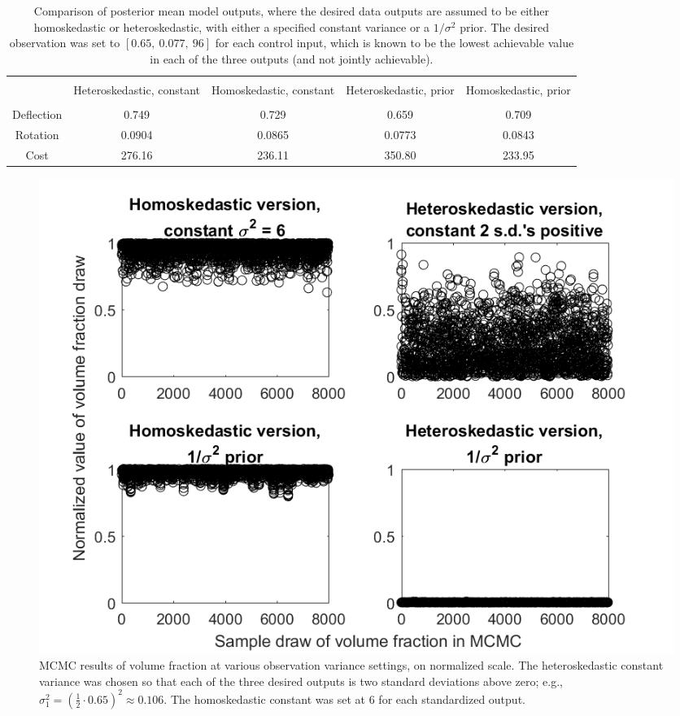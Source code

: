 \documentclass{article}
\begin{document}
\begin{table}[h]
\centering
\begin{tabular}{| c | c  |  c  | c |  c  |}
\hline
 \vspace{-3mm}
& & & & \\
& \parbox{24mm}{\centering Heteroskedastic, constant}& \parbox{24mm}{\centering Homoskedastic, constant}& \parbox{24mm}{\centering Heteroskedastic, prior} & \parbox{24mm}{\centering Homoskedastic, prior}\\
 \vspace{-3.5mm}
& & & & \\
\hline
Deflection & 0.749 & 0.729 & 0.659 & 0.709\\
Rotation & 0.0904 & 0.0865 & 0.0773 & 0.0843\\
Cost & 276.16 & 236.11 & 350.80 & 233.95 \\
\hline
\end{tabular}
\captionsetup{width=.8\linewidth}
\caption{Comparison of posterior mean model outputs, where the desired data outputs are assumed to be either homoskedastic or heteroskedastic, with either a specified constant variance or a $1/\sigma^2$ prior. The desired observation was set to $[0.65,\ 0.077,\ 96]$ for each control input, which is known to be the lowest achievable value in each of the three outputs (and not jointly achievable). }
\label{table:obs_vvar_comp}
\end{table}

\begin{figure}[h]
\centering
\includegraphics[width=.75\linewidth]{FIG_comp_obs_var}
\captionsetup{width=.65\linewidth}
\caption{MCMC results of volume fraction at various observation variance settings, on normalized scale. The heteroskedastic constant variance was chosen so that each of the three desired outputs is two standard deviations above zero; e.g., $\sigma^2_1 = \left(\frac12\cdot 0.65\right)^2\approx0.106$. The homoskedastic constant was set at 6 for each standardized output.}
\label{fig:comp_obs_var}
\end{figure}
\end{document}
